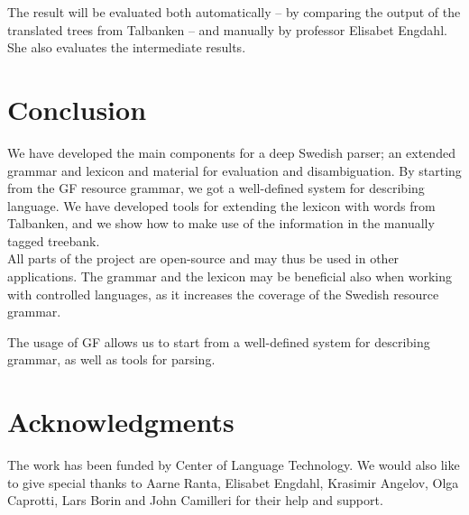 \documentclass[10pt, a4paper]{article}
\begin{document}
The result will be evaluated both automatically -- by comparing the output of
the translated trees from Talbanken -- and manually by professor Elisabet Engdahl.
She also evaluates the intermediate results.

\section{Conclusion}
We have developed the main components
for a deep Swedish parser; an extended grammar and lexicon and material for
evaluation and disambiguation.
By starting from the GF resource grammar, we got a well-defined system for
describing language. 
We have developed tools for extending the lexicon with words from Talbanken,
and we show how to make use of the information in the manually tagged
treebank.
\\
All parts of the project are open-source and may thus be used in other applications.
The grammar and the lexicon may be beneficial also when working with controlled languages,
as it increases the coverage of the Swedish resource grammar.

The usage of GF allows us to start from
a well-defined system for describing grammar, as well as tools for
parsing.

\section{Acknowledgments}
The work has been funded by Center of Language Technology.
We would also like to give special thanks to Aarne Ranta,
Elisabet Engdahl, Krasimir Angelov, Olga Caprotti, Lars Borin and John Camilleri for their help
and support.



\end{document}
